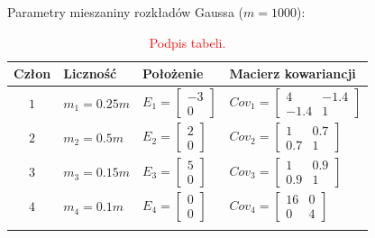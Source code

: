 \documentclass[12pt,a4paper,oneside]{book}
\theoremstyle{definition}
\begin{document}
Parametry mieszaniny rozkładów Gaussa ($m=1000$):
\begin{table}[H]
\caption{\textcolor{red}{Podpis tabeli.}}
\centering
\begin{tabular}{ clll }
\toprule
\textbf{Człon} & \textbf{Liczność} & \textbf{Położenie} & \textbf{Macierz kowariancji} \\ 
\toprule
\addlinespace[0.2cm]
$1$ & $m_1 = 0.25m$ & $E_1 = \begin{bmatrix} -3 \\ 0 \end{bmatrix}$ & $Cov_1 = \begin{bmatrix} 4 & -1.4 \\ -1.4 & 1 \end{bmatrix}$ \\
\addlinespace[0.2cm]
$2$ & $m_2 = 0.5m$ & $E_2 = \begin{bmatrix} 2 \\ 0 \end{bmatrix}$ & $Cov_2 = \begin{bmatrix} 1 & 0.7 \\ 0.7 & 1 \end{bmatrix}$ \\
\addlinespace[0.2cm]
$3$ & $m_3 = 0.15m$ & $E_3 = \begin{bmatrix} 5 \\ 0 \end{bmatrix}$ & $Cov_3 = \begin{bmatrix} 1 & 0.9 \\ 0.9 & 1 \end{bmatrix}$ \\
\addlinespace[0.2cm]
$4$ & $m_4 = 0.1m$ & $E_4 = \begin{bmatrix} 0 \\ 0 \end{bmatrix}$ & $Cov_4 = \begin{bmatrix} 16 & 0 \\ 0 & 4 \end{bmatrix}$ \\
\addlinespace[0.1cm]
\bottomrule
\end{tabular}
\end{table}
\end{document}
